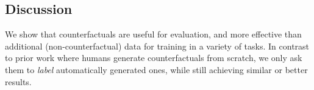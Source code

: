 












\subsection{Discussion}
\label{subsec:label_efficiency}
We show that \sysname counterfactuals are useful for evaluation, and more effective than additional (non-counterfactual) data for training in a variety of tasks. 
In contrast to prior work where humans generate counterfactuals from scratch, we only ask them to \emph{label} automatically generated ones, while still achieving similar or better results.

